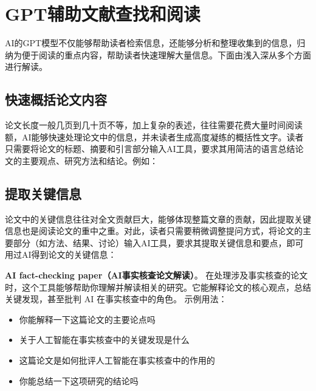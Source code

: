 \section{GPT辅助文献查找和阅读}

AI的GPT模型不仅能够帮助读者检索信息，还能够分析和整理收集到的信息，归纳为便于阅读的重点内容，帮助读者快速理解大量信息。下面由浅入深从多个方面进行解读。

\subsection{快速概括论文内容}
论文长度一般几页到几十页不等，加上复杂的表述，往往需要花费大量时间阅读额，AI能够快速处理论文中的信息，并未读者生成高度凝练的概括性文字。读者只需要将论文的标题、摘要和引言部分输入AI工具，要求其用简洁的语言总结论文的主要观点、研究方法和结论。例如：

\subsection{提取关键信息}
论文中的关键信息往往对全文贡献巨大，能够体现整篇文章的贡献，因此提取关键信息也是阅读论文的重中之重。对此，读者只需要稍微调整提问方式，将论文的主要部分（如方法、结果、讨论）输入AI工具，要求其提取关键信息和要点，即可用过AI得到论文的关键信息：

\textbf{AI fact-checking paper（AI事实核查论文解读）}。
在处理涉及事实核查的论文时，这个工具能够帮助你理解并解读相关的研究。它能解释论文的核心观点，总结关键发现，甚至批判 AI 在事实核查中的角色。
示例用法：
\begin{itemize}
    \item 你能解释一下这篇论文的主要论点吗
    \item 关于人工智能在事实核查中的关键发现是什么
    \item 这篇论文是如何批评人工智能在事实核查中的作用的
    \item 你能总结一下这项研究的结论吗
\end{itemize}

